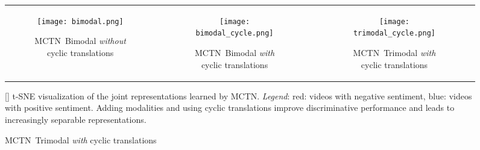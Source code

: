 \documentclass[letterpaper]{article} %
\newcommand{\ours}{MCTN}
\begin{document}
\begin{figure}[!tb]
\centering
\setlength\tabcolsep{1.0pt}
\begin{tabular}{ccc}
\begin{subfigure}{0.33\linewidth}\centering\texttt{[image: bimodal.png]}\caption{
\centering
\footnotesize{
\centering
\ours \ Bimodal \textit{without} cyclic translations}
}\label{fig:taba}\end{subfigure} &
\begin{subfigure}{0.33\linewidth}\centering\texttt{[image: bimodal\_cycle.png]}\caption{
\centering
\footnotesize{\ours \ Bimodal \textit{with} cyclic translations}
}\label{fig:tabb}\end{subfigure} &
\begin{subfigure}{0.33\linewidth}\centering\texttt{[image: trimodal\_cycle.png]}\caption{
\centering
\footnotesize{\ours \ Trimodal \textit{with} cyclic translations}
}\label{fig:tabc}\end{subfigure}\\
\end{tabular}
[]{
\small
{t-SNE visualization of the joint representations learned by \ours. \textit{Legend}: red: videos with negative sentiment, blue: videos with positive sentiment. Adding modalities and using cyclic translations improve discriminative performance and leads to increasingly separable representations.}
}
\label{fig:tsne}
\end{figure}
\end{document}
